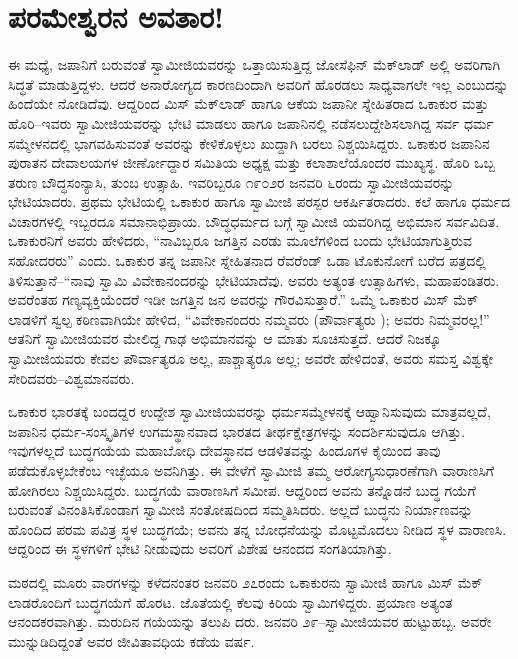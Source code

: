 
\chapter{ಪರಮೇಶ್ವರನ ಅವತಾರ!}

\noindent

ಈ ಮಧ್ಯೆ, ಜಪಾನಿಗೆ ಬರುವಂತೆ ಸ್ವಾಮೀಜಿಯವರನ್ನು ಒತ್ತಾಯಿಸುತ್ತಿದ್ದ ಜೋಸೆಫಿನ್ ಮೆಕ್​ಲಾಡ್ ಅಲ್ಲಿ ಅವರಿಗಾಗಿ ಸಿದ್ಧತೆ ಮಾಡುತ್ತಿದ್ದಳು. ಆದರೆ ಅನಾರೋಗ್ಯದ ಕಾರಣದಿಂದಾಗಿ ಅವರಿಗೆ ಹೊರಡಲು ಸಾಧ್ಯವಾಗಲೇ ಇಲ್ಲ ಎಂಬುದನ್ನು ಹಿಂದೆಯೇ ನೋಡಿದೆವು. ಆದ್ದರಿಂದ ಮಿಸ್ ಮೆಕ್​ಲಾಡ್ ಹಾಗೂ ಆಕೆಯ ಜಪಾನೀ ಸ್ನೇಹಿತರಾದ ಒಕಾಕುರ ಮತ್ತು ಹೊರಿ–ಇವರು ಸ್ವಾಮೀಜಿಯವರನ್ನು ಭೇಟಿ ಮಾಡಲು ಹಾಗೂ ಜಪಾನಿನಲ್ಲಿ ನಡೆಸಲುದ್ದೇಶಿಸಲಾಗಿದ್ದ ಸರ್ವ ಧರ್ಮ ಸಮ್ಮೇಳನದಲ್ಲಿ ಭಾಗವಹಿಸುವಂತೆ ಅವರನ್ನು ಕೇಳಿಕೊಳ್ಳಲು ಖುದ್ದಾಗಿ ಬರಲು ನಿಶ್ಚಯಿಸಿದ್ದರು. ಒಕಾಕುರ ಜಪಾನಿನ ಪುರಾತನ ದೇವಾಲಯಗಳ ಜೀರ್ಣೋದ್ದಾರ ಸಮಿತಿಯ ಅಧ್ಯಕ್ಷ ಮತ್ತು ಕಲಾಶಾಲೆಯೊಂದರ ಮುಖ್ಯಸ್ಥ. ಹೊರಿ ಒಬ್ಬ ತರುಣ ಬೌದ್ಧಸಂನ್ಯಾಸಿ, ತುಂಬ ಉತ್ಸಾಹಿ. ಇವರಿಬ್ಬರೂ ೧೯೦೨ರ ಜನವರಿ ೬ರಂದು ಸ್ವಾಮೀಜಿಯವರನ್ನು ಭೇಟಿಯಾದರು. ಪ್ರಥಮ ಭೇಟಿಯಲ್ಲಿ ಒಕಾಕುರ ಹಾಗೂ ಸ್ವಾಮೀಜಿ ಪರಸ್ಪರ ಆಕರ್ಷಿತರಾದರು. ಕಲೆ ಹಾಗೂ ಧರ್ಮದ ವಿಚಾರಗಳಲ್ಲಿ ಇಬ್ಬರದೂ ಸಮಾನಾಭಿಪ್ರಾಯ. ಬೌದ್ಧಧರ್ಮದ ಬಗ್ಗೆ ಸ್ವಾಮೀಜಿ ಯವರಿಗಿದ್ದ ಅಭಿಮಾನ ಸರ್ವವಿದಿತ. ಒಕಾಕುರನಿಗೆ ಅವರು ಹೇಳಿದರು, “ನಾವಿಬ್ಬರೂ ಜಗತ್ತಿನ ಎರಡು ಮೂಲೆಗಳಿಂದ ಬಂದು ಭೇಟಿಯಾಗುತ್ತಿರುವ ಸಹೋದರರು” ಎಂದು. ಒಕಾಕುರ ತನ್ನ ಜಪಾನೀ ಸ್ನೇಹಿತನಾದ ರೆವರೆಂಡ್ ಒಡಾ ಟೊಕುನೋಗೆ ಬರೆದ ಪತ್ರದಲ್ಲಿ ತಿಳಿಸುತ್ತಾನೆ–“ನಾವು ಸ್ವಾಮಿ ವಿವೇಕಾನಂದರನ್ನು ಭೇಟಿಯಾದೆವು. ಅವರು ಅತ್ಯಂತ ಉತ್ಸಾಹಿಗಳು, ಮಹಾಪಂಡಿತರು. ಅವರೆಂತಹ ಗಣ್ಯವ್ಯಕ್ತಿಯೆಂದರೆ ಇಡೀ ಜಗತ್ತಿನ ಜನ ಅವರನ್ನು ಗೌರವಿಸುತ್ತಾರೆ.” ಒಮ್ಮೆ ಒಕಾಕುರ ಮಿಸ್ ಮೆಕ್​ಲಾಡಳಿಗೆ ಸ್ವಲ್ಪ ಕಠಿಣವಾಗಿಯೇ ಹೇಳಿದ, “ವಿವೇಕಾನಂದರು ನಮ್ಮವರು (ಪೌರ್ವಾತ್ಯರು ); ಅವರು ನಿಮ್ಮವರಲ್ಲ!” ಆತನಿಗೆ ಸ್ವಾಮೀಜಿಯವರ ಮೇಲಿದ್ದ ಗಾಢ ಅಭಿಮಾನವನ್ನು ಆ ಮಾತು ಸೂಚಿಸುತ್ತದೆ. ಆದರೆ ನಿಜಕ್ಕೂ ಸ್ವಾಮೀಜಿಯವರು ಕೇವಲ ಪೌರ್ವಾತ್ಯರೂ ಅಲ್ಲ, ಪಾಶ್ಚಾತ್ಯರೂ ಅಲ್ಲ; ಅವರೇ ಹೇಳಿದಂತೆ, ಅವರು ಸಮಸ್ತ ವಿಶ್ವಕ್ಕೇ ಸೇರಿದವರು–ವಿಶ್ವಮಾನವರು.

ಒಕಾಕುರ ಭಾರತಕ್ಕೆ ಬಂದದ್ದರ ಉದ್ದೇಶ ಸ್ವಾಮೀಜಿಯವರನ್ನು ಧರ್ಮಸಮ್ಮೇಳನಕ್ಕೆ ಆಹ್ವಾನಿಸುವುದು ಮಾತ್ರವಲ್ಲದೆ, ಜಪಾನಿನ ಧರ್ಮ-ಸಂಸ್ಕೃತಿಗಳ ಉಗಮಸ್ಥಾನವಾದ ಭಾರತದ ತೀರ್ಥಕ್ಷೇತ್ರಗಳನ್ನು ಸಂದರ್ಶಿಸುವುದೂ ಆಗಿತ್ತು. ಇವುಗಳಲ್ಲದೆ ಬುದ್ಧಗಯೆಯ ಮಹಾಬೋಧಿ ದೇವಸ್ಥಾನದ ಆಡಳಿತವನ್ನು ಹಿಂದೂಗಳ ಕೈಯಿಂದ ತಾವು ಪಡೆದುಕೊಳ್ಳಬೇಕೆಂಬ ಇಚ್ಛೆಯೂ ಅವನಿಗಿತ್ತು. ಈ ವೇಳೆಗೆ ಸ್ವಾಮೀಜಿ ತಮ್ಮ ಆರೋಗ್ಯಸುಧಾರಣೆಗಾಗಿ ವಾರಾಣಸಿಗೆ ಹೋಗಿರಲು ನಿಶ್ಚಯಿಸಿದ್ದರು. ಬುದ್ಧಗಯೆ ವಾರಾಣಸಿಗೆ ಸಮೀಪ. ಆದ್ದರಿಂದ ಅವನು ತನ್ನೊಡನೆ ಬುದ್ಧ ಗಯೆಗೆ ಬರುವಂತೆ ವಿನಂತಿಸಿಕೊಂಡಾಗ ಸ್ವಾಮೀಜಿ ಸಂತೋಷದಿಂದ ಸಮ್ಮತಿಸಿದರು. ಅಲ್ಲದೆ ಬುದ್ಧನು ನಿರ್ಯಾಣವನ್ನು ಹೊಂದಿದ ಪರಮ ಪವಿತ್ರ ಸ್ಥಳ ಬುದ್ಧಗಯೆ; ಅವನು ತನ್ನ ಬೋಧನೆಯನ್ನು ಮೊಟ್ಟಮೊದಲು ನೀಡಿದ ಸ್ಥಳ ವಾರಾಣಸಿ. ಆದ್ದರಿಂದ ಈ ಸ್ಥಳಗಳಿಗೆ ಭೇಟಿ ನೀಡುವುದು ಅವರಿಗೆ ವಿಶೇಷ ಆನಂದದ ಸಂಗತಿಯಾಗಿತ್ತು.

ಮಠದಲ್ಲಿ ಮೂರು ವಾರಗಳನ್ನು ಕಳೆದನಂತರ ಜನವರಿ ೨೭ರಂದು ಒಕಾಕುರನು ಸ್ವಾಮೀಜಿ ಹಾಗೂ ಮಿಸ್ ಮೆಕ್​ಲಾಡರೊಂದಿಗೆ ಬುದ್ಧಗಯೆಗೆ ಹೊರಟ. ಜೊತೆಯಲ್ಲಿ ಕೆಲವು ಕಿರಿಯ ಸ್ವಾಮಿಗಳಿದ್ದರು. ಪ್ರಯಾಣ ಅತ್ಯಂತ ಆನಂದಕರವಾಗಿತ್ತು. ಮರುದಿನ ಗಯೆಯನ್ನು ತಲುಪಿ ದರು. ಜನವರಿ ೨೯–ಸ್ವಾಮೀಜಿಯವರ ಹುಟ್ಟುಹಬ್ಬ. ಅವರೇ ಮುನ್ನುಡಿದಿದ್ದಂತೆ ಅವರ ಜೀವಿತಾವಧಿಯ ಕಡೆಯ ವರ್ಷ.

